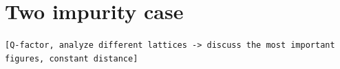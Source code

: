\documentclass[aps,pra,superscriptaddress,twocolumn]{revtex4-1}
\newcommand{\commentSB}[1]{\texttt{\color{blue}[#1]}}
\newcommand{\commentSO}[1]{\texttt{\color{orange}[#1]}}
\begin{document}











\section{Two impurity case}
\commentSO{Q-factor, analyze different lattices -> discuss the most important figures, constant distance}
\end{document}
